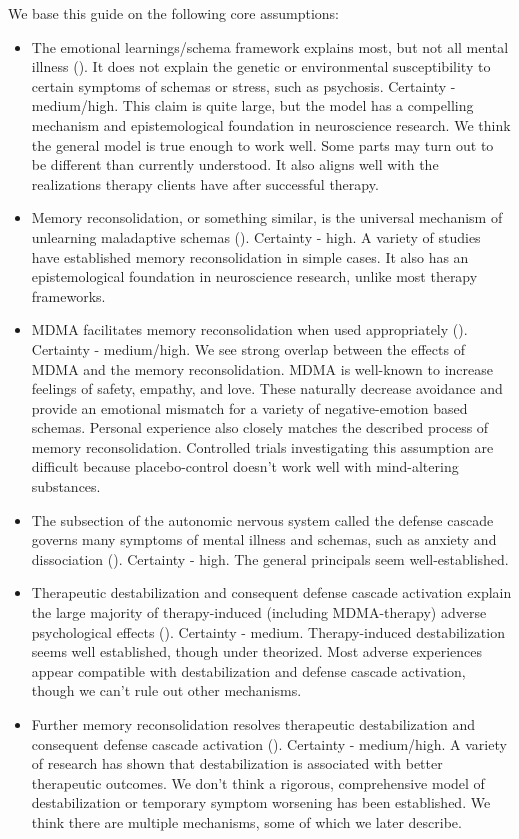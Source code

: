 \documentclass[12pt,letterpaper]{article}
\begin{document}
We base this guide on the following core assumptions:
\begin{itemize}
	\item The emotional learnings/schema framework explains most, but not all mental illness (\textcite{lesswrongCoherenceTherapy,eckerUnlocking}). It does not explain the genetic or environmental susceptibility to certain symptoms of schemas or stress, such as psychosis. Certainty - medium/high. This claim is quite large, but the model has a compelling mechanism and epistemological foundation in neuroscience research. We think the general model is true enough to work well. Some parts may turn out to be different than currently understood. It also aligns well with the realizations therapy clients have after successful therapy.
	\item Memory reconsolidation, or something similar, is the universal mechanism of unlearning maladaptive schemas (\textcite{lesswrongCoherenceTherapy,eckerUnlocking}). Certainty - high. A variety of studies have established memory reconsolidation in simple cases. It also has an epistemological foundation in neuroscience research, unlike most therapy frameworks. 
	\item MDMA facilitates memory reconsolidation when used appropriately (\textcite{fedduciaMDMAMemoryReconsolidation}). Certainty - medium/high. We see strong overlap between the effects of MDMA and the memory reconsolidation. MDMA is well-known to increase feelings of safety, empathy, and love. These naturally decrease avoidance and provide an emotional mismatch for a variety of negative-emotion based schemas. Personal experience also closely matches the described process of memory reconsolidation. Controlled trials investigating this assumption are difficult because placebo-control doesn't work well with mind-altering substances.
	\item The subsection of the autonomic nervous system called the defense cascade governs many symptoms of mental illness and schemas, such as anxiety and dissociation (\textcite{kozlowskaDefenseCascade}). Certainty - high. The general principals seem well-established.
	\item Therapeutic destabilization and consequent defense cascade activation explain the large majority of therapy-induced (including MDMA-therapy) adverse psychological effects (\textcite{olthofDestabilization}). Certainty - medium. Therapy-induced destabilization seems well established, though under theorized. Most adverse experiences appear compatible with destabilization and defense cascade activation, though we can't rule out other mechanisms.
	\item Further memory reconsolidation resolves therapeutic destabilization and consequent defense cascade activation (\textcite{olthofDestabilization}). Certainty - medium/high. A variety of research has shown that destabilization is associated with better therapeutic outcomes. We don't think a rigorous, comprehensive model of destabilization or temporary symptom worsening has been established. We think there are multiple mechanisms, some of which we later describe.
\end{itemize}
\end{document}
